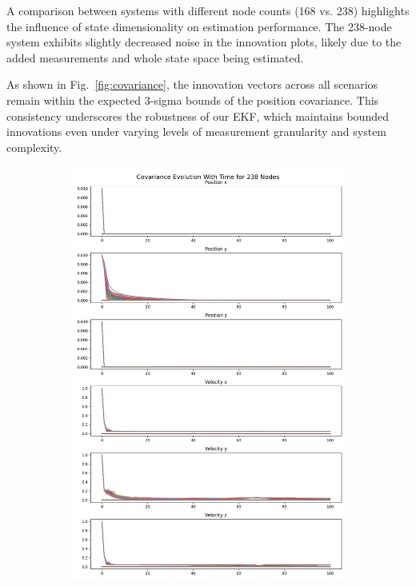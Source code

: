 A comparison between systems with different node counts (168 vs. 238) highlights the influence of state dimensionality on estimation performance. The 238-node system exhibits slightly decreased noise in the innovation plots, likely due to the added measurements and whole state space being estimated.

As shown in Fig.~\ref{fig:covariance}, the innovation vectors across all scenarios remain within the expected 3-sigma bounds of the position covariance. This consistency underscores the robustness of our EKF, which maintains bounded innovations even under varying levels of measurement granularity and system complexity.

\begin{figure}
    \centering
    \begin{subfigure}[b]{0.32\linewidth}
        \includegraphics[width=\linewidth]{CLOTH REPORT PICS/covariance 238.jpg}

\end{subfigure}
\end{figure}
